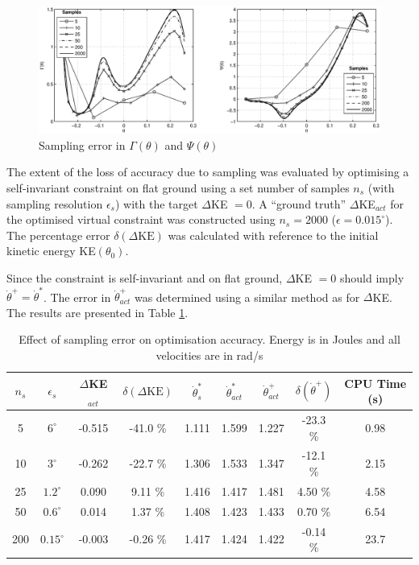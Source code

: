 \begin{figure}
	\centering
	\includegraphics[width=\linewidth]{4VirtConstLib/samplingerror.eps}
	\caption{Sampling error in $\Gamma(\theta)$ and $\Psi(\theta)$}
	\label{fig:samplingerror}
\end{figure}

The extent of the loss of accuracy due to sampling was evaluated by optimising a self-invariant constraint on flat ground using a set number of samples $n_s$ (with sampling resolution $\epsilon_s$) with the target $\Delta$KE $=0$. A  ``ground truth'' $\Delta$KE$_{act}$ for the optimised virtual constraint was constructed using $n_s=2000$ ($\epsilon = 0.015^\circ$). The percentage error $\delta(\Delta\mathrm{KE})$ was calculated with reference to the initial kinetic energy KE$(\theta_0)$.

Since the constraint is self-invariant and on flat ground, $\Delta$KE $=0$ should imply $\dot{\theta}^+=\dot{\theta}^*$. The error in $\dot{\theta}^+_{act}$ was determined using a similar method as for $\Delta$KE. The results are presented in Table \ref{tab:samplingerror}.

\begin{table}
	\centering
	\begin{tabular}{ c | c || c | c || c | c | c  | c || c }
		$n_s$ & $\epsilon_s$ & $\Delta$KE$_{act}$ & $\delta(\Delta\mathrm{KE})$ & $\dot{\theta}^*_s$ & $\dot{\theta}^*_{act}$ & $\dot{\theta}^+_{act}$ & $\delta(\dot{\theta}^+)$ & CPU Time (s) \\ \hline
		5   & $6^\circ$    & -0.515 & -41.0 \% & 1.111 & 1.599 & 1.227 & -23.3 \% & 0.98 \\
		10  & $3^\circ$    & -0.262 & -22.7 \% & 1.306 & 1.533 & 1.347 & -12.1 \% & 2.15 \\
		25  & $1.2^\circ$  & 0.090  & 9.11 \%  & 1.416 & 1.417 & 1.481 & 4.50 \%  & 4.58 \\
		50  & $0.6^\circ$  & 0.014  & 1.37 \%  & 1.408 & 1.423 & 1.433 & 0.70 \%  & 6.54 \\
		200 & $0.15^\circ$ & -0.003 & -0.26 \% & 1.417 & 1.424 & 1.422 & -0.14 \% & 23.7
	\end{tabular}
	\caption[Effect of sampling error on optimisation accuracy]{Effect of sampling error on optimisation accuracy. Energy is in Joules and all velocities are in rad/s}
	\label{tab:samplingerror}
\end{table}

